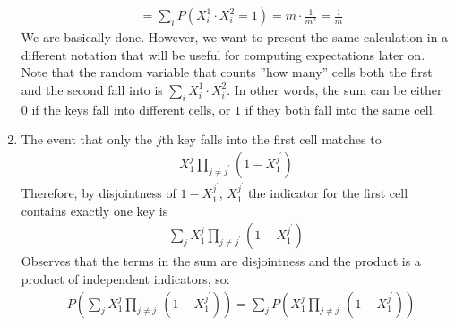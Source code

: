 \begin{example}
\begin{enumerate}
\begin{equation*}
\begin{split}
            &= \sum_{i}{P( X_{i}^1 \cdot X_{i}^{2} = 1)} = m\cdot \frac{1}{m^{2}} = \frac{1}{m}
          \end{split}
        \end{equation*} 
        We are basically done. However, we want to present the same calculation in a different notation that will be useful for computing expectations later on. Note that the random variable that counts ''how many'' cells both the first and the second fall into is $\sum_{i}{X_{i}^{1}\cdot X_{i}^{2} }$. In other words, the sum can be either $0$ if the keys fall into different cells, or $1$ if they both fall into the same cell.
      \item The event that only the $j$th key falls into the first cell matches to 
        \begin{equation*}
          \begin{split}
            X_{1}^{j}\prod_{j\neq j^{\prime}}\left( 1 - X_{1}^{j^{\prime}} \right)
          \end{split}
        \end{equation*}
        Therefore, by disjointness of $1-X_{1}^{j^{\prime}}$, $X_{1}^{j^{\prime}}$ the indicator for the first cell contains exactly one key is 
        \begin{equation*}
          \begin{split}
            \sum_{j}{X_{1}^{j}\prod_{j\neq j^{\prime}}\left( 1 - X_{1}^{j^{\prime}} \right)} 
          \end{split}
        \end{equation*} Observes that the terms in the sum are disjointness and the product is a product of independent indicators, so:
        \begin{equation*}
          \begin{split}
            & P\left(\sum_{j}{X_{1}^{j}\prod_{j\neq j^{\prime}}\left( 1 - X_{1}^{j^{\prime}} \right)} \right) = \sum_{j}{ P\left( X_{1}^{j}\prod_{j\neq j^{\prime}}\left( 1 - X_{1}^{j^{\prime}} \right) \right)}
          \end{split}
        \end{equation*}
    \end{enumerate}
  \end{example}


